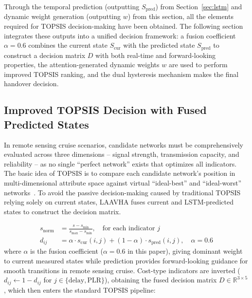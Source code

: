 \documentclass[journal,article,submit,moreauthors]{Definitions/mdpi}
\begin{document}
Through the temporal prediction (outputting $S_{\text{pred}}$) from Section~\ref{sec:lstm} and dynamic weight generation (outputting $w$) from this section, all the elements required for TOPSIS decision-making have been obtained. The following section integrates these outputs into a unified decision framework: a fusion coefficient $\alpha = 0.6$ combines the current state $S_{\text{cur}}$ with the predicted state $S_{\text{pred}}$ to construct a decision matrix $D$ with both real-time and forward-looking properties, the attention-generated dynamic weights $w$ are used to perform improved TOPSIS ranking, and the dual hysteresis mechanism makes the final handover decision.

\subsection{Improved TOPSIS Decision with Fused Predicted States}
\label{sec:topsis}

In remote sensing cruise scenarios, candidate networks must be comprehensively evaluated across three dimensions -- signal strength, transmission capacity, and reliability -- as no single ``perfect network'' exists that optimizes all indicators. The basic idea of TOPSIS is to compare each candidate network's position in multi-dimensional attribute space against virtual ``ideal-best'' and ``ideal-worst'' networks~\cite{ref7,ref8}. To avoid the passive decision-making caused by traditional TOPSIS relying solely on current states, LAAVHA fuses current and LSTM-predicted states to construct the decision matrix.

\begin{equation}
\begin{aligned}
s_{\text{norm}} &= \frac{s - s_{\min}}{s_{\max} - s_{\min}}, \quad \text{for each indicator } j \\
d_{ij} &= \alpha \cdot s_{\text{cur}}(i,j) + (1-\alpha) \cdot s_{\text{pred}}(i,j), \quad \alpha = 0.6
\end{aligned}
\label{eq:fusion}
\end{equation}
where $\alpha$ is the fusion coefficient ($\alpha = 0.6$ in this paper), giving dominant weight to current measured states while prediction provides forward-looking guidance for smooth transitions in remote sensing cruise. Cost-type indicators are inverted ($d_{ij} \leftarrow 1 - d_{ij}$ for $j \in \{\text{delay}, \text{PLR}\}$), obtaining the fused decision matrix $D \in \mathbb{R}^{3 \times 5}$, which then enters the standard TOPSIS pipeline:
\end{document}

